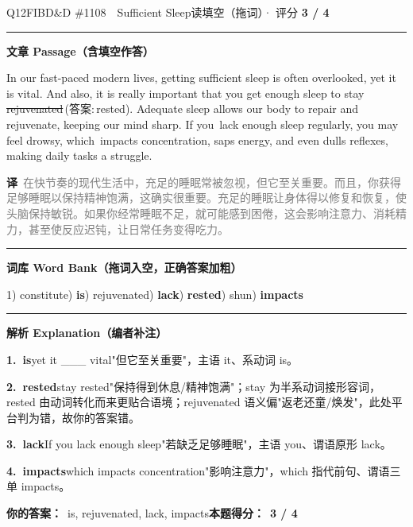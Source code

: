 \documentclass[11pt]{article}
\newcommand{\ptesub}[1]{%
  \par\needspace{2\baselineskip}\smallskip
  {\color{cAccent}\rule[-0.2ex]{3pt}{1.05em}}\hspace{6pt}%
  {\bfseries\color{cHead}#1}\par\nopagebreak\smallskip}
\newcommand{\zh}[1]{{\footnotesize\textcolor{cNote}{\textbf{译}}\ \textcolor{gray}{#1}}}
\newcommand{\rok}[1]{{\color{cFix}\ding{51}\,#1}}                 %
\newcommand{\rno}[2]{{\color{cWrong}\ding{55}\,\sout{#1}}\,{\footnotesize\color{cFix}(答案:\,#2)}}  %
\begin{document}
\begin{qblock}{Q12\quad FIBD\&D \#1108\ \ Sufficient Sleep}{读填空（拖词）· 评分 \textcolor{cAccent}{\bfseries 3 / 4}}
\ptesub{文章 Passage（含填空作答）}
\begin{promptbox}
In our fast-paced modern lives, getting sufficient sleep is often overlooked, yet it \rok{is} vital. And also, it is really important that you get enough sleep to stay \rno{rejuvenated}{rested}. Adequate sleep allows our body to repair and rejuvenate, keeping our mind sharp. If you \rok{lack} enough sleep regularly, you may feel drowsy, which \rok{impacts} concentration, saps energy, and even dulls reflexes, making daily tasks a struggle.
\end{promptbox}
\zh{在快节奏的现代生活中，充足的睡眠常被忽视，但它至关重要。而且，你获得足够睡眠以保持精神饱满，这确实很重要。充足的睡眠让身体得以修复和恢复，使头脑保持敏锐。如果你经常睡眠不足，就可能感到困倦，这会影响注意力、消耗精力，甚至使反应迟钝，让日常任务变得吃力。}
\ptesub{词库 Word Bank（拖词入空，正确答案加粗）}
{\small 1) constitute) \textbf{is}) rejuvenated) \textbf{lack}) \textbf{rested}) shun) \textbf{impacts}}
\ptesub{解析 Explanation（编者补注）}
\begin{notebox}\footnotesize
\textbf{1.\ is}\quad yet it \_\_\_ vital"但它至关重要"，主语 it、系动词 is。\par\smallskip
\textbf{2.\ rested}\quad stay rested"保持得到休息/精神饱满"；stay 为半系动词接形容词，rested 由动词转化而来更贴合语境；rejuvenated 语义偏"返老还童/焕发"，此处平台判为错，故你的答案错。\par\smallskip
\textbf{3.\ lack}\quad If you lack enough sleep"若缺乏足够睡眠"，主语 you、谓语原形 lack。\par\smallskip
\textbf{4.\ impacts}\quad which impacts concentration"影响注意力"，which 指代前句、谓语三单 impacts。
\end{notebox}
\smallskip
\textbf{你的答案：}\ is, {\color{cWrong}rejuvenated}, lack, impacts\qquad\textbf{本题得分：}\ {\color{cAccent}\bfseries 3 / 4}
\end{qblock}
\end{document}
